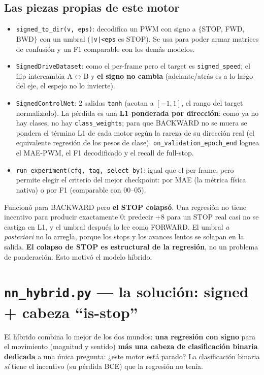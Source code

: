 \documentclass[11pt,a4paper]{article}
\newcommand{\code}[1]{\lstinline[basicstyle=\ttfamily\normalsize]|#1|}
\begin{document}
\subsection*{Las piezas propias de este motor}
\begin{itemize}
  \item \code{signed_to_dir(v, eps)}: decodifica un PWM con signo a $\{$STOP, FWD, BWD$\}$ con un umbral
  (\texttt{|v|<eps} es STOP). Se usa para poder armar matrices de confusión y un F1 comparable con los demás
  modelos.
  \item \code{SignedDriveDataset}: como el per-frame pero el target es \code{signed_speed}; el flip
  intercambia A$\leftrightarrow$B y \textbf{el signo no cambia} (adelante/atrás es a lo largo del eje, el espejo
  no lo invierte).
  \item \code{SignedControlNet}: 2 salidas \code{tanh} (acotan a $[-1,1]$, el rango del target normalizado).
  La pérdida es una \textbf{L1 ponderada por dirección}: como ya no hay clases, no hay \code{class_weights};
  para que BACKWARD no se muera se pondera el término L1 de cada motor según la rareza de su dirección real
  (el equivalente regresión de los pesos de clase). \code{on_validation_epoch_end} loguea el MAE-PWM, el F1
  decodificado y el recall de full-stop.
  \item \code{run_experiment(cfg, tag, select_by)}: igual que el per-frame, pero permite elegir el criterio del
  mejor checkpoint: por MAE (la métrica física nativa) o por F1 (comparable con 00--05).
\end{itemize}

\begin{ojo}
Funcionó para BACKWARD pero \textbf{el STOP colapsó}. Una regresión no tiene incentivo para producir
exactamente 0: predecir +8 para un STOP real casi no se castiga en L1, y el umbral después lo lee como
FORWARD. El umbral \emph{a posteriori} no lo arregla, porque los stops y los avances lentos se solapan en la
salida. \textbf{El colapso de STOP es estructural de la regresión}, no un problema de ponderación. Esto motivó
el modelo híbrido.
\end{ojo}

\section{\texttt{nn\_hybrid.py} --- la solución: signed + cabeza ``is-stop''}
El híbrido combina lo mejor de los dos mundos: \textbf{una regresión con signo} para el movimiento (magnitud y
sentido) \textbf{más una cabeza de clasificación binaria dedicada} a una única pregunta: ¿este motor está
parado? La clasificación binaria \emph{sí} tiene el incentivo (su pérdida BCE) que la regresión no tenía.
\end{document}
